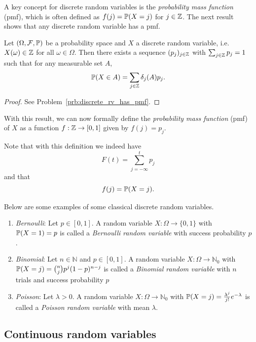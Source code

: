 A key concept for discrete random variables is the \emph{probability mass function} (pmf), which is often defined as $f(j) = \mathbb P(X = j)$ for $j \in \mathbb Z$. The next result shows that any discrete random variable has a pmf.

\begin{lemma}\label{lem:existence_pmf}
Let $(\Omega, \mathcal F, \mathbb{P})$ be a probability space and $X$ a discrete random variable, i.e. $X(\omega) \in \mathbb Z$ for all $\omega \in \Omega$. Then there exists a sequence $(p_j)_{j \in \mathbb Z}$ with $\sum_{j \in \mathbb Z} p_j = 1$ such that for any measurable set $A$,
\[
	\mathbb P(X \in A) = \sum_{j \in \mathbb Z} \delta_j(A) p_j.
\]
\end{lemma}

\begin{proof}
See Problem~\ref{prb:discrete_rv_has_pmf}.
\end{proof}

With this result, we can now formally define the \emph{probability mass function} (pmf) of $X$ as a function $f : \mathbb Z \to [0,1]$ given by $f(j) = p_j$.

Note that with this definition we indeed have
\[
	F(t) = \sum_{j = -\infty}^t p_j
\]
and that
\[
	f(j) = \mathbb P(X = j).
\]

Below are some examples of some classical discrete random variables.

\begin{example}\hfill
\begin{enumerate}[label=(\alph*)]
\item \textit{Bernoulli}: Let $p \in [0,1]$. A random variable $X : \Omega \to \{0,1\}$ with $\mathbb P(X = 1) = p$ is called a \emph{Bernoulli random variable} with success probability $p$.
\item \textit{Binomial}: Let $n \in \mathbb{N}$ and $p \in [0,1]$. A random variable $X : \Omega \to \mathbb{N}_0$ with $\mathbb P(X = j) = \binom{n}{j} p^j (1-p)^{n-j}$ is called a \emph{Binomial random variable} with $n$ trials and success probability $p$
\item \textit{Poisson}: Let $\lambda > 0$. A random variable $X : \Omega \to \mathbb{N}_0$ with $\mathbb P(X = j) = \frac{\lambda^j}{j!} e^{-\lambda}$ is called a \emph{Poisson random variable} with mean $\lambda$.
\end{enumerate}
\end{example}

\subsection{Continuous random variables}\label{ssec:contrinuous_rv}

